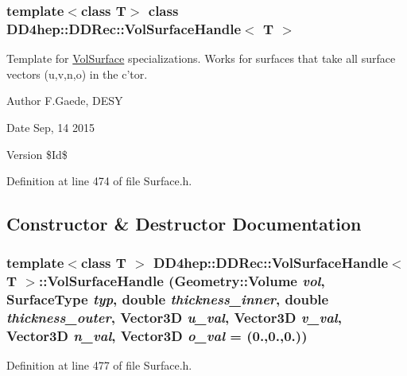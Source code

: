 \subsubsection*{template$<$class T$>$ class DD4hep::DDRec::VolSurfaceHandle$<$ T $>$}

Template for \hyperlink{class_d_d4hep_1_1_d_d_rec_1_1_vol_surface}{VolSurface} specializations. Works for surfaces that take all surface vectors (u,v,n,o) in the c'tor. \begin{DoxyAuthor}{Author}
F.Gaede, DESY 
\end{DoxyAuthor}
\begin{DoxyDate}{Date}
Sep, 14 2015 
\end{DoxyDate}
\begin{DoxyVersion}{Version}
\$Id\$ 
\end{DoxyVersion}


Definition at line 474 of file Surface.h.

\subsection{Constructor \& Destructor Documentation}
\hypertarget{class_d_d4hep_1_1_d_d_rec_1_1_vol_surface_handle_a94c84574cd5621be9f053d0734f80e46}{
\subsubsection[{VolSurfaceHandle}]{\setlength{\rightskip}{0pt plus 5cm}template$<$class T $>$ {\bf DD4hep::DDRec::VolSurfaceHandle}$<$ {\bf T} $>$::{\bf VolSurfaceHandle} ({\bf Geometry::Volume} {\em vol}, \/  {\bf SurfaceType} {\em typ}, \/  double {\em thickness\_\-inner}, \/  double {\em thickness\_\-outer}, \/  {\bf Vector3D} {\em u\_\-val}, \/  {\bf Vector3D} {\em v\_\-val}, \/  {\bf Vector3D} {\em n\_\-val}, \/  {\bf Vector3D} {\em o\_\-val} = {(0.,0.,0.)})}}
\label{class_d_d4hep_1_1_d_d_rec_1_1_vol_surface_handle_a94c84574cd5621be9f053d0734f80e46}


Definition at line 477 of file Surface.h.

